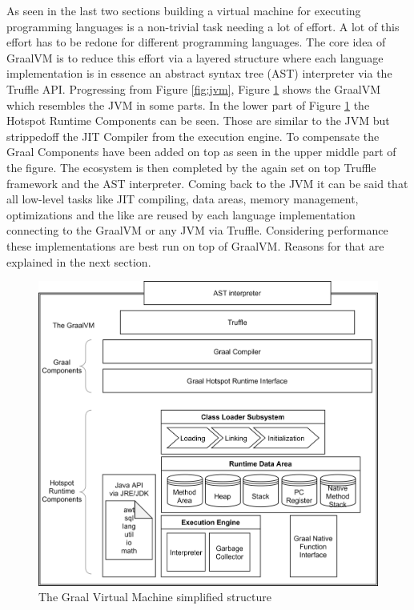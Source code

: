 As seen in the last two sections building a virtual machine for executing programming languages is a non-trivial task needing a lot of effort. A lot of this effort has to be redone for different programming languages. The core idea of GraalVM is to reduce this effort via a layered structure where each language implementation is in essence an abstract syntax tree (AST) interpreter via the Truffle API. Progressing from Figure \ref{fig:jvm}, Figure \ref{fig:graalvm} shows the GraalVM which resembles the JVM in some parts. In the lower part of Figure \ref{fig:graalvm} the Hotspot Runtime Components can be seen.  Those are similar to the JVM but strippedoff the JIT Compiler from the execution engine. To compensate the Graal Components have been added on top as seen in the upper middle part of the figure. The ecosystem is then completed by the again set on top Truffle framework and the AST interpreter. Coming back to the JVM it can be said that all low-level tasks like JIT compiling, data areas, memory management, optimizations and the like are reused by each language implementation connecting to the GraalVM or any JVM via Truffle. Considering performance these implementations are best run on top of GraalVM. Reasons for that are explained in the next section.

\begin{figure}[h!]
    \centering
    \includegraphics[scale=0.8]{figures/GraalVM.png}
    \caption{The Graal Virtual Machine simplified structure}
    \label{fig:graalvm}
\end{figure}

